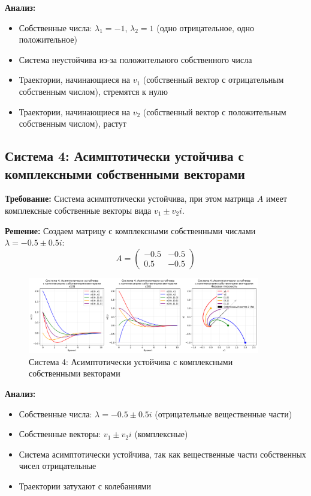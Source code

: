 \textbf{Анализ:}
\begin{itemize}
    \item Собственные числа: $\lambda_1 = -1$, $\lambda_2 = 1$ (одно отрицательное, одно положительное)
    \item Система неустойчива из-за положительного собственного числа
    \item Траектории, начинающиеся на $v_1$ (собственный вектор с отрицательным собственным числом), стремятся к нулю
    \item Траектории, начинающиеся на $v_2$ (собственный вектор с положительным собственным числом), растут
\end{itemize}

\subsection*{Система 4: Асимптотически устойчива с комплексными собственными векторами}

\textbf{Требование:} Система асимптотически устойчива, при этом матрица $A$ имеет комплексные собственные векторы вида $v_1 \pm v_2 i$.

\textbf{Решение:} Создаем матрицу с комплексными собственными числами $\lambda = -0.5 \pm 0.5i$:
\begin{equation}
A = \begin{pmatrix} -0.5 & -0.5 \\ 0.5 & -0.5 \end{pmatrix}
\end{equation}

\begin{figure}[H]
    \centering
    \includegraphics[width=0.9\textwidth]{images/task1/system4_asymptotically_stable_complex.png}
    \caption{Система 4: Асимптотически устойчива с комплексными собственными векторами}
\end{figure}

\textbf{Анализ:}
\begin{itemize}
    \item Собственные числа: $\lambda = -0.5 \pm 0.5i$ (отрицательные вещественные части)
    \item Собственные векторы: $v_1 \pm v_2 i$ (комплексные)
    \item Система асимптотически устойчива, так как вещественные части собственных чисел отрицательные
    \item Траектории затухают с колебаниями
\end{itemize}

